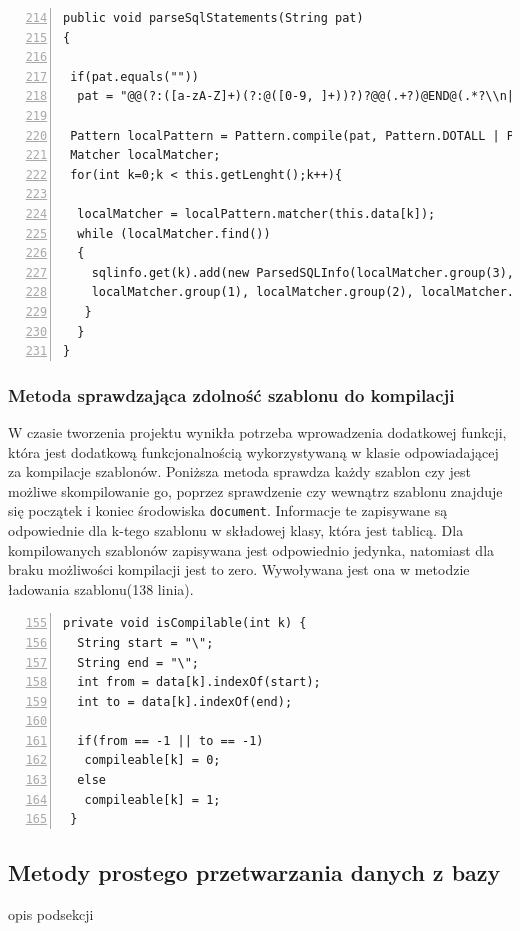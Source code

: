  \begin{lstlisting}[numbers=left,firstnumber=214]
public void parseSqlStatements(String pat)
{

 if(pat.equals(""))
  pat = "@@(?:([a-zA-Z]+)(?:@([0-9, ]+))?)?@@(.+?)@END@(.*?\\n|.*)";
    
 Pattern localPattern = Pattern.compile(pat, Pattern.DOTALL | Pattern.MULTILINE);
 Matcher localMatcher;
 for(int k=0;k < this.getLenght();k++){

  localMatcher = localPattern.matcher(this.data[k]);
  while (localMatcher.find())
  {
    sqlinfo.get(k).add(new ParsedSQLInfo(localMatcher.group(3),
    localMatcher.group(1), localMatcher.group(2), localMatcher.end()));
   }
  }
}
  \end{lstlisting}
   
\subsubsection*{Metoda sprawdzająca zdolność szablonu do kompilacji}

W czasie tworzenia projektu wynikła potrzeba wprowadzenia dodatkowej funkcji, która jest dodatkową funkcjonalnością wykorzystywaną w klasie odpowiadającej za kompilacje szablonów. Poniższa metoda sprawdza każdy szablon czy jest możliwe skompilowanie go, poprzez sprawdzenie czy wewnątrz szablonu znajduje się początek i koniec środowiska \texttt{document}. Informacje te zapisywane są odpowiednie dla k-tego szablonu w składowej klasy, która jest tablicą. Dla kompilowanych szablonów zapisywana jest odpowiednio jedynka, natomiast dla braku możliwości kompilacji jest to zero. Wywoływana jest ona w metodzie ładowania szablonu(138 linia).

 \begin{lstlisting}[numbers=left,firstnumber=155]
 private void isCompilable(int k) {
  String start = "\";
  String end = "\";
  int from = data[k].indexOf(start);
  int to = data[k].indexOf(end);
        
  if(from == -1 || to == -1)
   compileable[k] = 0;
  else
   compileable[k] = 1;
 }
  \end{lstlisting}
  
\subsection{Metody prostego przetwarzania danych z bazy}

opis podsekcji

